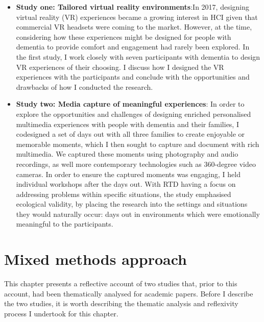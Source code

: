 \begin{itemize}
    \item  \textbf{Study one: Tailored virtual reality environments}:In 2017, designing virtual reality (VR) experiences became a growing interest in HCI given that commercial VR headsets were coming to the market. However, at the time, considering how these experiences might be designed for people with dementia to provide comfort and engagement had rarely been explored. In the first study, I work closely with seven participants with dementia to design VR experiences of their choosing. I discuss how I designed the VR experiences with the participants and conclude with the opportunities and drawbacks of how I conducted the research.

    \item \textbf{Study two: Media capture of meaningful experiences}:    In order to explore the opportunities and challenges of designing enriched personalised multimedia experiences with people with dementia and their families, I codesigned a set of days out with all three families to create enjoyable or memorable moments, which I then sought to capture and document with rich multimedia. We captured these moments using photography and audio recordings, as well more contemporary technologies such as 360-degree video cameras. In order to ensure the captured moments was engaging, I held individual workshops after the days out. With RTD having a focus on addressing problems within specific situations, the study emphasised ecological validity, by placing the research into the settings and situations they would naturally occur: days out in environments which were emotionally meaningful to the participants.
\end{itemize}

\section{Mixed methods approach}
\label{mixed-methods}
This chapter presents a reflective account of two studies that, prior to this account, had been thematically analysed for academic papers. Before I describe the two studies, it is worth describing the thematic analysis and reflexivity process I undertook for this chapter.


